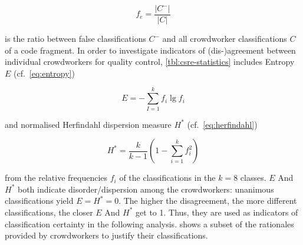 \begin{equation}f_e = \frac{|C^-|}{|C|}\label{eq:errorrate}\end{equation}

is the ratio between false classifications \(C^-\) and all crowdworker classifications \(C\) of a code fragment.
In order to investigate indicators of (dis-)agreement between individual crowdworkers for quality control, \cref{tbl:csre-statistics} includes Entropy \(E\) (cf.~\cref{eq:entropy})

\begin{equation}E = - \sum\limits^k_{I=1}f_i \lg f_i\label{eq:entropy}\end{equation}

and normalised Herfindahl dispersion measure \(H^*\) (cf.~\cref{eq:herfindahl})

\begin{equation}H^*=\frac{k}{k-1}\left(1-\sum\limits_{i=1}^{k}f_i^2\right)\label{eq:herfindahl}\end{equation}

from the relative frequencies \(f_i\) of the classifications in the \(k=8\) classes.
\(E\) And \(H^*\) both indicate disorder/dispersion among the crowdworkers: unanimous classifications yield \(E=H^*=0\).
The higher the disagreement, the more different classifications, the closer \(E\) And \(H^*\) get to 1.
Thus, they are used as indicators of classification certainty in the following analysis.
 shows a subset of the rationales provided by crowdworkers to justify their classifications.

